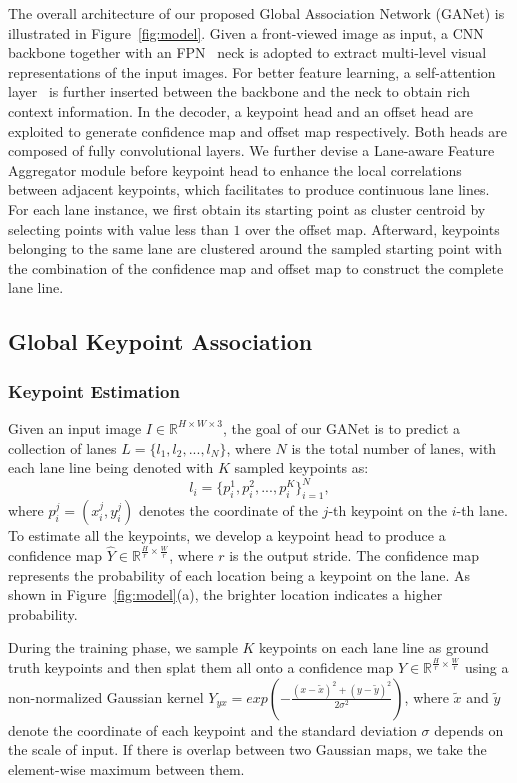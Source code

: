 \documentclass[10pt,twocolumn,letterpaper]{article}
\begin{document}
The overall architecture of our proposed Global Association Network (GANet) is illustrated in Figure~\ref{fig:model}. 
Given a front-viewed image as input, a CNN backbone together with an FPN~\cite{lin2017feature} neck is adopted to extract multi-level visual representations of the input images. 
For better feature learning, a self-attention layer~\cite{vaswani2017attention} is further inserted between the backbone and the neck to obtain rich context information.
In the decoder, a keypoint head and an offset head are exploited to generate confidence map and offset map respectively. Both heads are composed of fully convolutional layers. We further devise a Lane-aware Feature Aggregator module before keypoint head to enhance the local correlations between adjacent keypoints, which facilitates to produce continuous lane lines.
For each lane instance, we first obtain its starting point as cluster centroid by selecting points with value less than $1$ over the offset map.
Afterward, keypoints belonging to the same lane are clustered around the sampled starting point with the combination of the confidence map and offset map to construct the complete lane line.

\subsection{Global Keypoint Association}
\subsubsection{Keypoint Estimation}

Given an input image $I \in \mathbb{R}^{H\times W \times 3}$, the goal of our GANet is to predict a collection of lanes $L=\{l_1, l_2, ..., l_N\}$, where $N$ is the total number of lanes, with each lane line being denoted with $K$ sampled keypoints as:
\begin{equation}
    l_i = \{p_i^1, p_i^2, ..., p_i^K\}_{i=1}^N,
    \label{equation:keypoints}
\end{equation}
where $p_i^j=(x_i^j, y_i^j)$ denotes the coordinate of the $j$-th keypoint on the $i$-th lane.
To estimate all the keypoints, we develop a keypoint head to produce a confidence map $\hat{Y} \in \mathbb{R}^{\frac{H}{r} \times \frac{W}{r}}$, where $r$ is the output stride. 
The confidence map represents the probability of each location being a keypoint on the lane.
As shown in Figure~\ref{fig:model}(a), the brighter location indicates a higher probability.

During the training phase, we sample $K$ keypoints on each lane line as ground truth keypoints and then splat them all onto a confidence map $Y \in \mathbb{R}^{\frac{H}{r} \times \frac{W}{r}}$ using a non-normalized Gaussian kernel $Y_{yx} = exp(- \frac{(x-\tilde{x})^2 + (y-\tilde{y})^2}{2 \sigma^2})$, where $\tilde{x}$ and $\tilde{y}$ denote the coordinate of each keypoint and the standard deviation $\sigma$ depends on the scale of input. 
If there is overlap between two Gaussian maps, we take the element-wise maximum between them.
\end{document}
